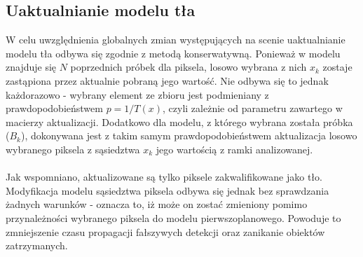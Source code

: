\subsection{Uaktualnianie modelu tła}
W celu uwzględnienia globalnych zmian występujących na scenie uaktualnianie modelu tła odbywa się zgodnie z metodą konserwatywną. Ponieważ w modelu znajduje się $N$ poprzednich próbek dla piksela, losowo wybrana z nich $x_{k}$ zostaje zastąpiona przez aktualnie pobraną jego wartość. Nie odbywa się to jednak każdorazowo - wybrany element ze zbioru jest podmieniany z prawdopodobieństwem $p = 1/T(x)$, czyli zależnie od parametru zawartego w macierzy aktualizacji. Dodatkowo dla modelu, z którego wybrana została próbka ($B_{k}$), dokonywana jest z takim samym prawdopodobieństwem aktualizacja losowo wybranego piksela z sąsiedztwa $x_{k}$ jego wartością z ramki analizowanej.
\paragraph{}
Jak wspomniano, aktualizowane są tylko piksele zakwalifikowane jako tło. Modyfikacja modelu sąsiedztwa piksela odbywa się jednak bez sprawdzania żadnych warunków - oznacza to, iż może on zostać zmieniony pomimo przynależności wybranego piksela do modelu pierwszoplanowego. Powoduje to zmniejszenie czasu propagacji fałszywych detekcji oraz zanikanie obiektów zatrzymanych.
